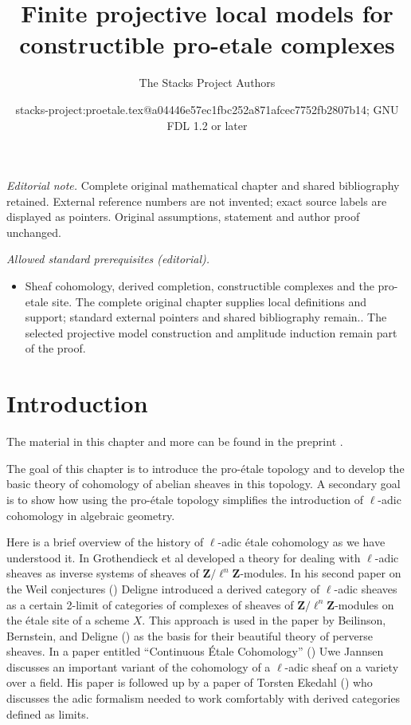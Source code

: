 \documentclass[10pt,a4paper]{article}
\title{Finite projective local models for constructible pro-etale complexes}
\author{The Stacks Project Authors}
\date{stacks-project:proetale.tex@a04446e57ec1fbc252a871afcec7752fb2807b14; GNU FDL 1.2 or later}
\theoremstyle{plain}
\theoremstyle{definition}
\theoremstyle{remark}
\numberwithin{equation}{subsection}
\begin{document}
\maketitle
\noindent\textit{Editorial note.} Complete original mathematical chapter and shared bibliography retained. External reference numbers are not invented; exact source labels are displayed as pointers. Original assumptions, statement and author proof unchanged.\par\medskip
\noindent\textit{Allowed standard prerequisites (editorial).}\begin{itemize}
\item Sheaf cohomology, derived completion, constructible complexes and the pro-etale site. The complete original chapter supplies local definitions and support; standard external pointers and shared bibliography remain.. The selected projective model construction and amplitude induction remain part of the proof.
\end{itemize}\medskip
\section{Introduction}
\label{section-introduction}

\noindent
The material in this chapter and more can be found in the preprint \cite{BS}.

\medskip\noindent
The goal of this chapter is to introduce the pro-\'etale topology and to
develop the basic theory of cohomology of abelian sheaves in this topology.
A secondary goal is to show how using the pro-\'etale topology simplifies
the introduction of $\ell$-adic cohomology in algebraic geometry.

\medskip\noindent
Here is a brief overview of the history of $\ell$-adic \'etale cohomology
as we have understood it.
In \cite[Expos\'es V and VI]{SGA5} Grothendieck et al developed a theory for
dealing with $\ell$-adic sheaves as inverse systems of sheaves of
$\mathbf{Z}/\ell^n\mathbf{Z}$-modules.
In his second paper on the Weil conjectures (\cite{WeilII}) Deligne introduced
a derived category of $\ell$-adic sheaves as a certain 2-limit of categories
of complexes of sheaves of $\mathbf{Z}/\ell^n\mathbf{Z}$-modules on the
\'etale site of a scheme $X$. This approach is used in the paper by
Beilinson, Bernstein, and Deligne (\cite{BBD}) as the basis for their
beautiful theory of perverse sheaves. In a paper entitled ``Continuous
\'Etale Cohomology'' (\cite{Jannsen}) Uwe Jannsen discusses an important
variant of the cohomology of a $\ell$-adic sheaf on a variety over a field.
His paper is followed up by a paper of Torsten Ekedahl (\cite{Ekedahl})
who discusses the adic formalism needed to work comfortably with derived
categories defined as limits.
\end{document}
